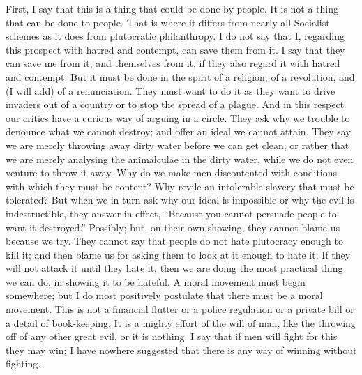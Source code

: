 \documentclass{book}
\begin{document}
First, I say that this is a thing that could be done by people. It is not a thing that can be done to people. That is where it differs from nearly all Socialist schemes as it does from plutocratic philanthropy. I do not say that I, regarding this prospect with hatred and contempt, can save them from it. I say that they can save me from it, and themselves from it, if they also regard it with hatred and contempt. But it must be done in the spirit of a religion, of a revolution, and (I will add) of a renunciation. They must want to do it as they want to drive invaders out of a country or to stop the spread of a plague. And in this respect our critics have a curious way of arguing in a circle. They ask why we trouble to denounce what we cannot destroy; and offer an ideal we cannot attain. They say we are merely throwing away dirty water before we can get clean; or rather that we are merely analysing the animalculae in the dirty water, while we do not even venture to throw it away. Why do we make men discontented with conditions with which they must be content? Why revile an intolerable slavery that must be tolerated? But when we in turn ask why our ideal is impossible or why the evil is indestructible, they answer in effect, “Because you cannot persuade people to want it destroyed.” Possibly; but, on their own showing, they cannot blame us because we try. They cannot say that people do not hate plutocracy enough to kill it; and then blame us for asking them to look at it enough to hate it. If they will not attack it until they hate it, then we are doing the most practical thing we can do, in showing it to be hateful. A moral movement must begin somewhere; but I do most positively postulate that there must be a moral movement. This is not a financial flutter or a police regulation or a private bill or a detail of book-keeping. It is a mighty effort of the will of man, like the throwing off of any other great evil, or it is nothing. I say that if men will fight for this they may win; I have nowhere suggested that there is any way of winning without fighting.
\end{document}

